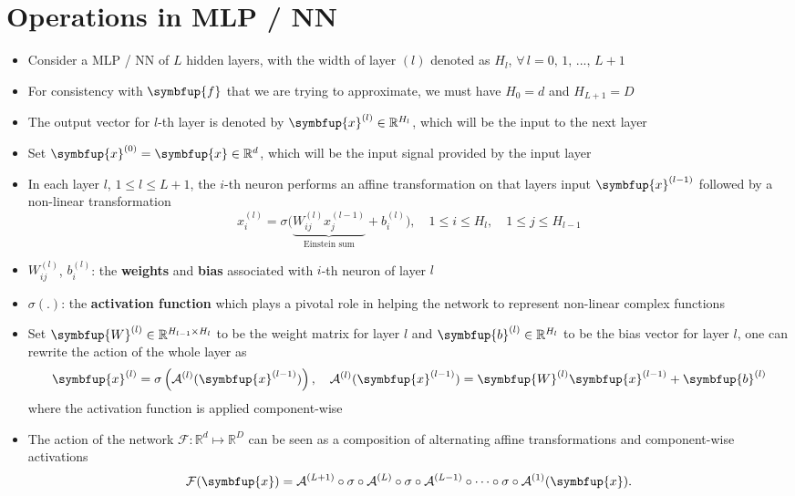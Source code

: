 \documentclass[11pt]{extarticle}
\newcommand{\vf}{\symbfup{f}}
\newcommand{\vx}{\symbfup{x}}
\newcommand{\vb}{\symbfup{b}}
\newcommand{\vW}{\symbfup{W}}
\theoremstyle{definition}
\newcommand{\Ro}{\mathbb{R}}           	                %
\begin{document}
\newpage

\section*{Operations in MLP / NN}

\begin{itemize}%
  \item Consider a MLP / NN of $L$ hidden layers, with the width of layer $(l)$ denoted as $H_l$, $\forall\,l=0,\,1,\,...,\,L+1$ 
  \item For consistency with $\vf$ that we are trying to approximate, we must have $H_0 = d$ and $H_{L+1} = D$
  \item The output vector for $l$-th layer is denoted by $\vx^{(l)}\in\Ro^{H_l}$, which will be the input to the next layer
  \item Set $\vx^{(0)} = \vx\in\Ro^d$, which will be the input signal provided by the input layer
  \item In each layer $l$, $1 \leqslant l \leqslant L+1$, the $i$-th neuron performs an affine transformation on that layers input $\vx^{(l-1)}$ followed by a non-linear transformation
    \begin{equation*}
      x_i^{(l)} = \sigma\Big(\underbrace{W^{(l)}_{ij} x_j^{(l-1)} }_{\text{Einstein sum}}+ b^{(l)}_i\Big), \quad 1 \leqslant i \leqslant H_l, \quad 1 \leqslant j \leqslant H_{l-1}
    \end{equation*}
  \item $W^{(l)}_{ij}$, $b^{(l)}_i$: the \textbf{weights} and \textbf{bias} associated with $i$-th neuron of layer $l$
  \item $\sigma(.)$: the \textbf{activation function} which plays a pivotal role in helping the network to represent non-linear complex functions
  \item Set $\vW^{(l)} \in \Ro^{H_{l-1} \times H_{l}}$ to be the weight matrix for layer $l$ and $\vb^{(l)} \in \Ro^{H_l}$ to be the bias vector for layer $l$, one can rewrite the action of the whole layer as
    \begin{equation}
      \vx^{(l)} = \sigma\left(\mathcal{A}^{(l)}(\vx^{(l-1)})\right), \quad \mathcal{A}^{(l)}(\vx^{(l-1)}) = \vW^{(l)} \vx^{(l-1)}+ \vb^{(l)}
    \end{equation}
    where the activation function is applied component-wise 
  \item The action of the network $\mathcal{F}: \Ro^d \mapsto \Ro^D$ can be seen as a composition of alternating affine transformations and component-wise activations
    \begin{equation}
      \mathcal{F}(\vx) = \mathcal{A}^{(L+1)} \circ \sigma \circ \mathcal{A}^{(L)} \circ  \sigma \circ \mathcal{A}^{(L-1)} \circ \cdots  \circ \sigma \circ \mathcal{A}^{(1)} (\vx).
    \end{equation}


\end{itemize}
\end{document}

